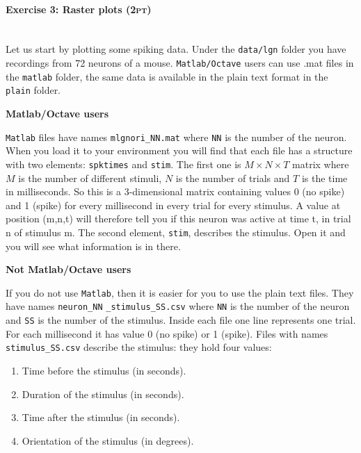 \documentclass[a4paper,11pt]{article}
\newenvironment{exercise}[3]{\paragraph{Exercise #1: #2 \textsc{(#3pt)}}\ \\}{
\medskip}
\begin{document}
\begin{exercise}{3}{Raster plots}{2}

Let us start by plotting some spiking data. Under the \texttt{data/lgn} folder you have recordings from 72 neurons of a mouse. \texttt{Matlab/Octave} users can use .mat files in the \texttt{matlab} folder, the same data is available in the plain text format in the \texttt{plain} folder.

\noindent 
\textbf{Matlab/Octave users}
\noindent 

\texttt{Matlab} files have names \texttt{mlgnori\_NN.mat} where \texttt{NN} is the number of the neuron. When you load it to your environment you will find that each file has a structure with two elements: \texttt{spktimes} and \texttt{stim}. The first one is $M\times N \times T$ matrix where $M$ is the number of different stimuli, $N$ is the number of trials and $T$ is the time in milliseconds. So this is a 3-dimensional matrix containing values 0 (no spike) and 1 (spike) for every millisecond in every trial for every stimulus. A value at position (m,n,t) will therefore tell you if this neuron was active at time t, in trial n of stimulus m. The second element, \texttt{stim}, describes the stimulus. Open it and you will see what information is in there.

\noindent
\textbf{Not Matlab/Octave users}
\noindent

If you do not use \texttt{Matlab}, then it is easier for you to use the plain text files. They have names \texttt{neuron\_NN} \texttt{\_stimulus\_SS.csv} where \texttt{NN} is the number of the neuron and \texttt{SS} is the number of the stimulus. Inside each file one line represents one trial. For each millisecond it has value 0 (no spike) or 1 (spike). Files with names \texttt{stimulus\_SS.csv} describe the stimulus: they hold four values:
\begin{enumerate}
\itemsep 0em
	\item Time before the stimulus (in seconds).
	\item Duration of the stimulus (in seconds).
	\item Time after the stimulus (in seconds).
	\item Orientation of the stimulus (in degrees).
\end{enumerate}


\end{exercise}
\end{document}
